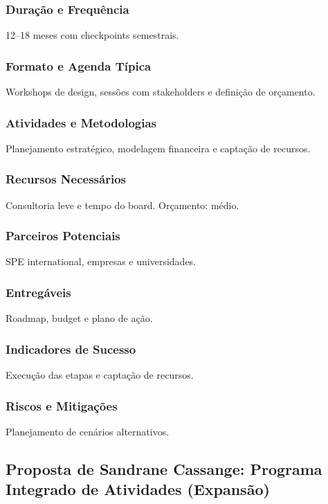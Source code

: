 \documentclass[12pt,a4paper]{article}
\begin{document}
\subsubsection*{Duração e Frequência}
12–18 meses com checkpoints semestrais.

\subsubsection*{Formato e Agenda Típica}
Workshops de design, sessões com stakeholders e definição de orçamento.

\subsubsection*{Atividades e Metodologias}
Planejamento estratégico, modelagem financeira e captação de recursos.

\subsubsection*{Recursos Necessários}
Consultoria leve e tempo do board. Orçamento: médio.

\subsubsection*{Parceiros Potenciais}
SPE international, empresas e universidades.

\subsubsection*{Entregáveis}
Roadmap, budget e plano de ação.

\subsubsection*{Indicadores de Sucesso}
Execução das etapas e captação de recursos.

\subsubsection*{Riscos e Mitigações}
Planejamento de cenários alternativos.

\subsection{Proposta de Sandrane Cassange: Programa Integrado de Atividades (Expansão)}
\end{document}

